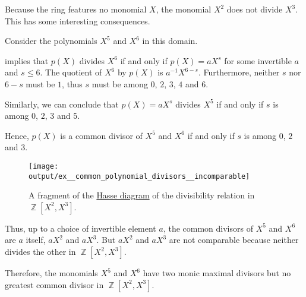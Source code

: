 \begin{example}
\begin{thmenum}
    Because the ring features no monomial \( X \), the monomial \( X^2 \) does not divide \( X^3 \). This has some interesting consequences.

    Consider the polynomials \( X^5 \) and \( X^6 \) in this domain.

     implies that \( p(X) \) divides \( X^6 \) if and only if \( p(X) = aX^s \) for some invertible \( a \) and \( s \leq 6 \). The quotient of \( X^6 \) by \( p(X) \) is \( a^{-1} X^{6-s} \). Furthermore, neither \( s \) nor \( 6 - s \) must be \( 1 \), thus \( s \) must be among \( 0 \), \( 2 \), \( 3 \), \( 4 \) and \( 6 \).

    Similarly, we can conclude that \( p(X) = aX^s \) divides \( X^5 \) if and only if \( s \) is among \( 0 \), \( 2 \), \( 3 \) and \( 5 \).

    Hence, \( p(X) \) is a common divisor of \( X^5 \) and \( X^6 \) if and only if \( s \) is among \( 0 \), \( 2 \) and \( 3 \).

    \begin{figure}[!ht]
      \centering
      \texttt{[image: output/ex\_\_common\_polynomial\_divisors\_\_incomparable]}
      \caption{A fragment of the \hyperref[def:hasse_diagram]{Hasse diagram} of the divisibility relation in \( \BbbZ[X^2, X^3] \).}
      \label{fig:ex:common_polynomial_divisors/incomparable}
    \end{figure}

    Thus, up to a choice of invertible element \( a \), the common divisors of \( X^5 \) and \( X^6 \) are \( a \) itself, \( aX^2 \) and \( aX^3 \). But \( aX^2 \) and \( aX^3 \) are not comparable because neither divides the other in \( \BbbZ[X^2, X^3] \).

    Therefore, the monomials \( X^5 \) and \( X^6 \) have two monic maximal divisors but no greatest common divisor in \( \BbbZ[X^2, X^3] \).
  \end{thmenum}
\end{example}

